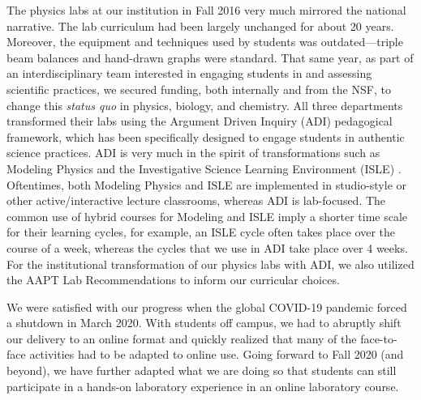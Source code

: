 \documentclass[aip, numerical, preprint]{revtex4-2}
\begin{document}

The physics labs at our institution in Fall 2016 very much mirrored the national narrative.
The lab curriculum had been largely unchanged for about 20 years. Moreover, the equipment and
techniques used by students was outdated---triple beam balances and hand-drawn graphs were
standard.  That same year, as part of an interdisciplinary team interested in engaging students
in and assessing scientific practices, we secured funding, both internally and from the NSF, to
change this \emph{status quo} in physics, biology, and chemistry.  All three departments
transformed their labs using the Argument Driven Inquiry
(ADI)\citep{Sampson2011,Walker2011,Walker2016} pedagogical framework, which has been
specifically designed to engage students in authentic science practices. ADI is very much in
the spirit of transformations such as Modeling Physics\cite{modelingBrewe2008} and the
Investigative Science Learning Environment (ISLE) \cite{etkina2007investigative}. Oftentimes,
both Modeling Physics and ISLE are implemented in studio-style or other active/interactive
lecture classrooms, whereas ADI is lab-focused. The common use of hybrid courses for Modeling
and ISLE imply a shorter time scale for their learning cycles, for example, an ISLE cycle often
takes place over the course of a week, whereas the cycles that we use in ADI take place over 4
weeks. For the institutional transformation of our physics labs with ADI, we also utilized the
AAPT Lab Recommendations to inform our curricular choices.\citep{kozminski2014aapt}

We were satisfied with our progress when the global COVID-19 pandemic forced a shutdown in
March 2020.  With students off campus, we had to abruptly shift our delivery to an online
format and quickly realized that many of the face-to-face activities had to be adapted to
online use.  Going forward to Fall 2020 (and beyond), we have further adapted what we are doing
so that students can still participate in a hands-on laboratory experience in an online
laboratory course.
\end{document}
